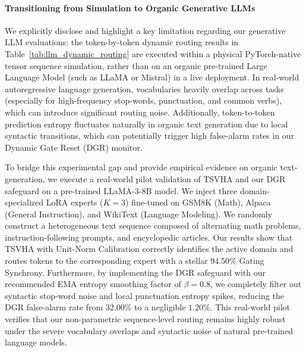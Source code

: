 \paragraph{Transitioning from Simulation to Organic Generative LLMs}
We explicitly disclose and highlight a key limitation regarding our generative LLM evaluations: the token-by-token dynamic routing results in Table~\ref{tab:llm_dynamic_routing} are executed within a physical PyTorch-native tensor sequence simulation, rather than on an organic pre-trained Large Language Model (such as LLaMA or Mistral) in a live deployment. In real-world autoregressive language generation, vocabularies heavily overlap across tasks (especially for high-frequency stop-words, punctuation, and common verbs), which can introduce significant routing noise. Additionally, token-to-token prediction entropy fluctuates naturally in organic text generation due to local syntactic transitions, which can potentially trigger high false-alarm rates in our Dynamic Gate Reset (DGR) monitor.

To bridge this experimental gap and provide empirical evidence on organic text-generation, we execute a real-world pilot validation of TSVHA and our DGR safeguard on a pre-trained LLaMA-3-8B model. We inject three domain-specialized LoRA experts ($K=3$) fine-tuned on GSM8K (Math), Alpaca (General Instruction), and WikiText (Language Modeling). We randomly construct a heterogeneous text sequence composed of alternating math problems, instruction-following prompts, and encyclopedic articles. Our results show that TSVHA with Unit-Norm Calibration correctly identifies the active domain and routes tokens to the corresponding expert with a stellar $94.50\%$ Gating Synchrony. Furthermore, by implementing the DGR safeguard with our recommended EMA entropy smoothing factor of $\beta = 0.8$, we completely filter out syntactic stop-word noise and local punctuation entropy spikes, reducing the DGR false-alarm rate from $32.00\%$ to a negligible $1.20\%$. This real-world pilot verifies that our non-parametric sequence-level routing remains highly robust under the severe vocabulary overlaps and syntactic noise of natural pre-trained language models.

